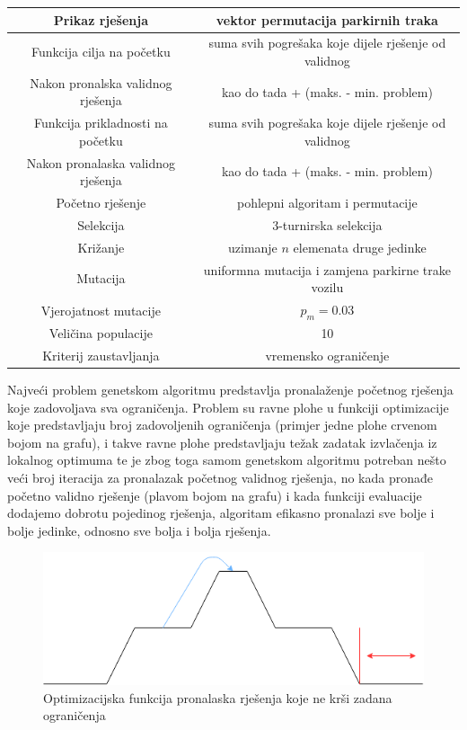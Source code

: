 \documentclass[11pt]{article}
\begin{document}
\begin{center}
\centering
{} \label{tab:title} 
  \begin{tabular}{ | >{\columncolor[gray]{0.6}}c |c|}
    \hline
     Prikaz rješenja & vektor permutacija parkirnih traka \\ \hline
     Funkcija cilja na početku & suma svih pogrešaka koje dijele rješenje od validnog \\ 
               Nakon pronalska validnog rješenja & kao do tada + (maks.  - min. problem) \\ \hline
     Funkcija prikladnosti na početku &  suma svih pogrešaka koje dijele rješenje od validnog\\ 
     Nakon pronalaska validnog rješenja &  kao do tada + (maks.  - min. problem) \\ \hline
     Početno rješenje &  pohlepni algoritam i permutacije \\ \hline
     Selekcija &  3-turnirska selekcija\\ \hline
     Križanje &  uzimanje $n$ elemenata druge jedinke\\ \hline
     Mutacija &  uniformna mutacija i zamjena parkirne trake vozilu\\ \hline
     Vjerojatnost mutacije &  $p_m=0.03$ \\ \hline
     Veličina populacije &  10\\ \hline
     Kriterij zaustavljanja & vremensko ograničenje \\ \hline
\end{tabular}
\end{center}
\newpage

Najveći problem genetskom algoritmu predstavlja pronalaženje početnog rješenja koje zadovoljava sva ograničenja. Problem su ravne plohe u funkciji optimizacije koje predstavljaju broj zadovoljenih ograničenja (primjer jedne plohe crvenom bojom na grafu), i takve ravne plohe predstavljaju težak zadatak izvlačenja iz lokalnog optimuma te je zbog toga samom genetskom algoritmu potreban nešto veći broj iteracija za pronalazak početnog validnog rješenja, no kada pronađe početno validno rješenje (plavom bojom na grafu) i kada funkciji evaluacije dodajemo dobrotu pojedinog rješenja, algoritam efikasno pronalazi sve bolje i bolje jedinke, odnosno sve bolja i bolja rješenja.
\begin{center}
\begin{figure}
  \includegraphics[width=\linewidth]{fjaOptimizacije.png}
  \caption{Optimizacijska funkcija pronalaska rješenja koje ne krši zadana ograničenja }
  \label{fig:optFun}
\end{figure}

\end{center}
\end{document}

